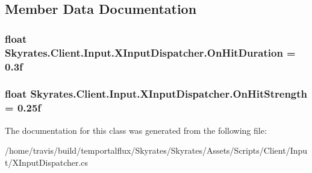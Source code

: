 \subsection{Member Data Documentation}
\hypertarget{class_skyrates_1_1_client_1_1_input_1_1_x_input_dispatcher_aebb6a36b42b636002a2ea32d6096ec31}{
\subsubsection[{On\-Hit\-Duration}]{\setlength{\rightskip}{0pt plus 5cm}float Skyrates.\-Client.\-Input.\-X\-Input\-Dispatcher.\-On\-Hit\-Duration = 0.\-3f}}\label{class_skyrates_1_1_client_1_1_input_1_1_x_input_dispatcher_aebb6a36b42b636002a2ea32d6096ec31}




\hypertarget{class_skyrates_1_1_client_1_1_input_1_1_x_input_dispatcher_a5f7cd1e18bea1cbd99c5df7dd27d4804}{
\subsubsection[{On\-Hit\-Strength}]{\setlength{\rightskip}{0pt plus 5cm}float Skyrates.\-Client.\-Input.\-X\-Input\-Dispatcher.\-On\-Hit\-Strength = 0.\-25f}}\label{class_skyrates_1_1_client_1_1_input_1_1_x_input_dispatcher_a5f7cd1e18bea1cbd99c5df7dd27d4804}






The documentation for this class was generated from the following file\-:\begin{DoxyCompactItemize}
\item 
/home/travis/build/temportalflux/\-Skyrates/\-Skyrates/\-Assets/\-Scripts/\-Client/\-Input/X\-Input\-Dispatcher.\-cs\end{DoxyCompactItemize}
